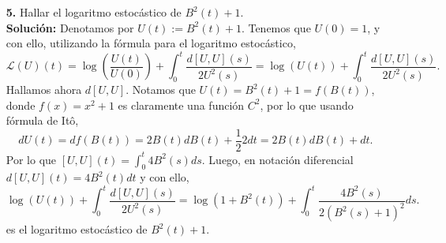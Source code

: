 \documentclass[letterpaper]{article}
\newcommand{\1}{\mathds{1}}
\theoremstyle{definition}
\theoremstyle{definition}
\theoremstyle{definition}
\theoremstyle{definition}
\theoremstyle{definition}
\begin{document}
\begin{itemize}
\begin{proof}
      \begin{align*}
        \mathcal{E}\left(\mathcal{L}(U)\right)(t)&=\exp \left(\mathcal{L}(U)(t)-\mathcal{L}(U)(0)-\frac{1}{2}\left[\mathcal{L}(U),\mathcal{L}(U)\right]\right)\\
        &=\exp \left(\mathcal{L}(U)(t)-\frac{1}{2}\left[\mathcal{L}(U),\mathcal{L}(U)\right]\right)\\
        &=\exp \left(\log \left(\frac{U(t)}{1}\right)+\int_{0}^{t}\frac{d[U,U](s)}{2U^2(s)}-\frac{1}{2}\left[\mathcal{L}(U),\mathcal{L}(U)\right]\right)\\
        &=U(t)\exp \left(\int_{0}^{t}\frac{d[U,U](s)}{2U^2(s)}-\frac{1}{2}\left[\mathcal{L}(U),\mathcal{L}(U)\right]\right)\\
      \end{align*}
      Por lo que si probamos que 
      \[
        \int_{0}^{t}\frac{d[U,U](s)}{2U^2(s)}-\frac{1}{2}\left[\mathcal{L}(U),\mathcal{L}(U)\right],
      \]
      acabamos. Calculamos la variación cuadrática de $\mathcal{L}(U)$. Primero, dado que 
      $\mathcal{L}(U)$ es justo el logaritmo estocástico de $U$, cumple 
      \[
      d(\mathcal{L}(U)(t))=\frac{1}{U(t)}dU(t),  
      \]
       Por otro lado, si $U$ es un proceso de Itô, entonces 
      \[
      dU(t)=\mu(t)dt+\sigma(t)dB(t),  
      \]
      para $\mu$, $\sigma$ procesos adaptados. Luego, $d[U,U](t)=\sigma^2(t)$. 
      así que 
      \[
        d(\mathcal{L}(U)(t))=\frac{1}{U(t)}dU(t)=\frac{\mu(t)}{U(t)}dt+\frac{\sigma(t)}{U(t)}dB(t),  
      \] 
      por lo que la covariación de $\mathcal{L}(U)$ está dada por 
      \[
      d\left[\mathcal{L}(U),\mathcal{L}(U)\right]=\frac{\sigma^2(t)}{U^2(t)}dt=\frac{\left[U,U\right](t)}{U^2(t)},  
      \]
      de modo que 
      \[
        \int_{0}^{t}\frac{d[U,U](s)}{2U^2(s)}-\frac{1}{2}\left[\mathcal{L}(U),\mathcal{L}(U)\right]=\int_{0}^{t}\frac{d[U,U](s)}{2U^2(s)}-\frac{1}{2}\int_{0}^{t}\frac{\left[U,U\right](s)}{U^2(s)}=0,
      \]
      y con ello, 
      \[
      \mathcal{E}(\mathcal{L}(U))(t)=U(t),  
      \]
      tal y como queríamos.
       
     \end{proof}
    \item[\textbf{5.}] Hallar el logaritmo estocástico de $B^2(t)+1$.\\
    
    \textbf{Solución:} Denotamos por $U(t):=B^2(t)+1$. Tenemos que $U(0)=1$, y con ello, 
    utilizando la fórmula para el logaritmo estocástico,
    \[
        \mathcal{L}(U)(t)=\log \left(\frac{U(t)}{U(0)}\right)+\int_{0}^{t}\frac{d \left[U,U\right](s)}{2U^2(s)}=\log(U(t))+\int_{0}^{t}\frac{d \left[U,U\right](s)}{2U^2(s)}.
    \]
    Hallamos ahora $d[U,U]$. Notamos que $U(t)=B^2(t)+1=f(B(t))$, donde $f(x)=x^2+1$ es 
    claramente una función $C^2$, por lo que usando fórmula de Itô,
    \[
    dU(t)=df(B(t))=2B(t)dB(t)+\frac{1}{2}2dt=2B(t)dB(t)+dt.    
    \]
    Por lo que $[U,U](t)=\int_{0}^{t}4B^2(s)ds$. Luego, en notación 
    diferencial $d[U,U](t)=4B^2(t)dt$ 
    y con ello, 
    \[
        \log(U(t))+\int_{0}^{t}\frac{d \left[U,U\right](s)}{2U^2(s)}=\log(1+B^2(t))+\int_{0}^{t}\frac{4B^2(s)}{2(B^2(s)+1)^2}ds.
    \]
    es el logaritmo estocástico de $B^2(t)+1$.
\end{itemize}
\end{document}
